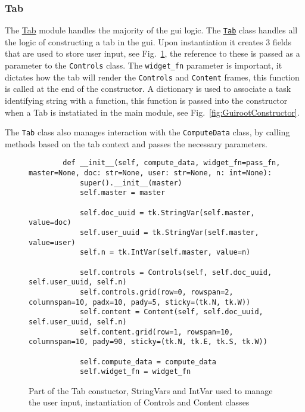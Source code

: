 \documentclass[11pt]{article}
\newcommand{\code}[1]{\colorbox{light-gray}{\texttt{#1}}}
\begin{document}
\subsubsection{Tab}
The \href{https://www2.macs.hw.ac.uk/~sf52/DocuTrace/html/DocuTrace.Gui.html#module-DocuTrace.Gui.Tab}{Tab} module handles the majority of the gui logic. The \href{https://www2.macs.hw.ac.uk/~sf52/DocuTrace/html/DocuTrace.Gui.html#DocuTrace.Gui.Tab.Tab}{\code{Tab}} class handles all the logic of constructing a tab in the gui.
Upon instantiation it creates 3 fields that are used to store user input, see Fig.~\ref{fig:TabConstuctor}, the reference to these is passed as a parameter to the \code{Controls} class.
The \code{widget\_fn} parameter is important, it dictates how the tab will render the \code{Controls} and \code{Content} frames, this function is called at the end of the constructor.
A dictionary is used to associate a task identifying string with a function, this function is passed into the constructor when a Tab is instatiated in the main module, see Fig.~\ref{fig:GuirootConstructor}.

The \code{Tab} class also manages interaction with the \code{ComputeData} class, by calling methods based on the tab context and passes the necessary parameters.

\begin{figure}
    \begin{verbatim}
        def __init__(self, compute_data, widget_fn=pass_fn, master=None, doc: str=None, user: str=None, n: int=None):
            super().__init__(master)
            self.master = master

            self.doc_uuid = tk.StringVar(self.master, value=doc)
            self.user_uuid = tk.StringVar(self.master, value=user)
            self.n = tk.IntVar(self.master, value=n)

            self.controls = Controls(self, self.doc_uuid, self.user_uuid, self.n)
            self.controls.grid(row=0, rowspan=2, columnspan=10, padx=10, pady=5, sticky=(tk.N, tk.W))
            self.content = Content(self, self.doc_uuid, self.user_uuid, self.n)
            self.content.grid(row=1, rowspan=10, columnspan=10, pady=90, sticky=(tk.N, tk.E, tk.S, tk.W))

            self.compute_data = compute_data
            self.widget_fn = widget_fn
    \end{verbatim}
    \caption{Part of the Tab constuctor, StringVars and IntVar used to manage the user input, instantiation of Controls and Content classes}
    \label{fig:TabConstuctor}
\end{figure}
\end{document}

